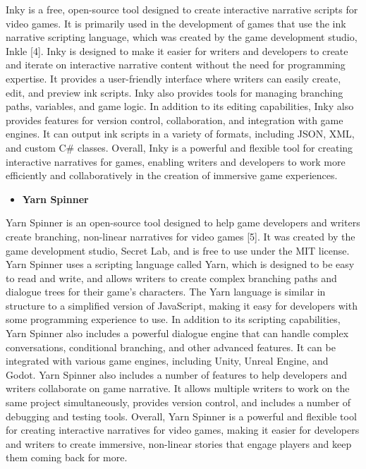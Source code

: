 Inky is a free, open-source tool designed to create interactive narrative scripts for video games. It is primarily used in the development of games that use the ink narrative scripting language, which was created by the game development studio, Inkle [4].
Inky is designed to make it easier for writers and developers to create and iterate on interactive narrative content without the need for programming expertise. It provides a user-friendly interface where writers can easily create, edit, and preview ink scripts. Inky also provides tools for managing branching paths, variables, and game logic.
In addition to its editing capabilities, Inky also provides features for version control, collaboration, and integration with game engines. It can output ink scripts in a variety of formats, including JSON, XML, and custom C# classes.
Overall, Inky is a powerful and flexible tool for creating interactive narratives for games, enabling writers and developers to work more efficiently and collaboratively in the creation of immersive game experiences.
\begin{itemize}
                \item \textbf{Yarn Spinner}
 \end{itemize}
 
 Yarn Spinner is an open-source tool designed to help game developers and writers create branching, non-linear narratives for video games [5]. It was created by the game development studio, Secret Lab, and is free to use under the MIT license.
Yarn Spinner uses a scripting language called Yarn, which is designed to be easy to read and write, and allows writers to create complex branching paths and dialogue trees for their game's characters. The Yarn language is similar in structure to a simplified version of JavaScript, making it easy for developers with some programming experience to use.
In addition to its scripting capabilities, Yarn Spinner also includes a powerful dialogue engine that can handle complex conversations, conditional branching, and other advanced features. It can be integrated with various game engines, including Unity, Unreal Engine, and Godot.
Yarn Spinner also includes a number of features to help developers and writers collaborate on game narrative. It allows multiple writers to work on the same project simultaneously, provides version control, and includes a number of debugging and testing tools.
Overall, Yarn Spinner is a powerful and flexible tool for creating interactive narratives for video games, making it easier for developers and writers to create immersive, non-linear stories that engage players and keep them coming back for more.


